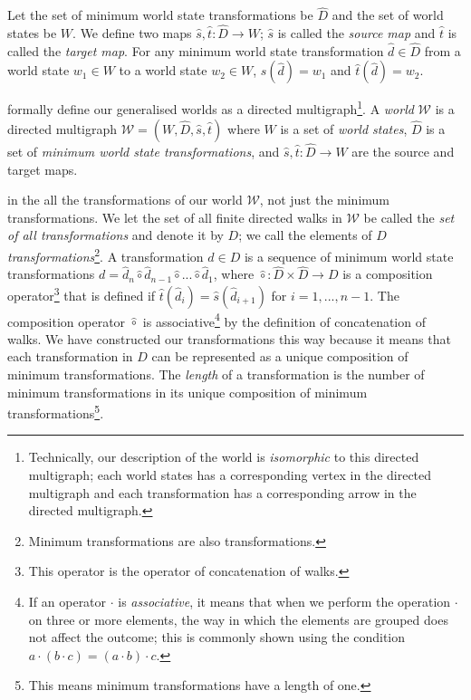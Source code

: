 Let the set of minimum world state transformations be $\hat{D}$ and the set of world states be $W$.
We define two maps $\hat{s},\hat{t}: \hat{D} \to W$; $\hat{s}$ is called the \emph{source map} and $\hat{t}$ is called the \emph{target map}.
For any minimum world state transformation $\hat{d} \in \hat{D}$ from a world state $w_{1} \in W$ to a world state $w_{2} \in W$, $\hat{s}(\hat{d}) = w_{1}$ and $\hat{t}(\hat{d}) = w_{2}$.

 formally define our generalised worlds as a directed multigraph\footnote{Technically, our description of the world is \textit{isomorphic} to this directed multigraph; each world states has a corresponding vertex in the directed multigraph and each transformation has a corresponding arrow in the directed multigraph.}.
A \emph{world} $\mathscr{W}$ is a directed multigraph $\mathscr{W} = (W, \hat{D}, \hat{s}, \hat{t})$ where $W$ is a set of \emph{world states}, $\hat{D}$ is a set of \emph{minimum world state transformations}, and $\hat{s},\hat{t}: \hat{D} \to W$ are the source and target maps.

 in the all the transformations of our world $\mathscr{W}$, not just the minimum transformations.
We let the set of all finite directed walks in $\mathscr{W}$ be called the \emph{set of all transformations} and denote it by $D$; we call the elements of $D$ \emph{transformations}\footnote{Minimum transformations are also transformations.}.
A transformation $d \in D$ is a sequence of minimum world state transformations $d = \hat{d}_{n} \hat{\circ} \hat{d}_{n-1} \hat{\circ} ... \hat{\circ} \hat{d}_{1}$, where $\hat{\circ}: \hat{D} \times \hat{D} \to D$ is a composition operator\footnote{This operator is the operator of concatenation of walks.} that is defined if $\hat{t}(\hat{d}_{i}) = \hat{s}(\hat{d}_{i+1})$ for $i = 1, ..., n-1$.
The composition operator $\hat{\circ}$ is associative\footnote{If an operator $\cdot$ is \emph{associative}, it means that when we perform the operation $\cdot$ on three or more elements, the way in which the elements are grouped does not affect the outcome; this is commonly shown using the condition $a \cdot (b \cdot c) = (a \cdot b) \cdot c$.} by the definition of concatenation of walks.
We have constructed our transformations this way because it means that each transformation in $D$ can be represented as a unique composition of minimum transformations. 
The \emph{length} of a transformation is the number of minimum transformations in its unique composition of minimum transformations\footnote{This means minimum transformations have a length of one.}.

